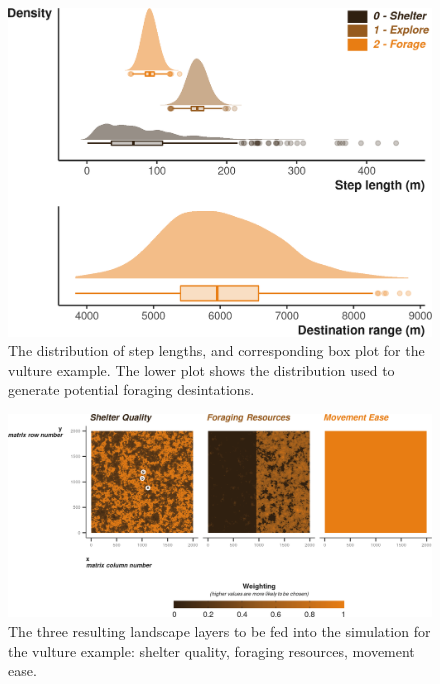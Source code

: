 \documentclass[10pt,a4paper]{article}
\begin{document}
\begin{figure}

{\centering \includegraphics{Agent-based_model_walkthrough_files/figure-latex/VULTUREsettingMoveDesPlot-1} 

}

\caption{The distribution of step lengths, and corresponding box plot for the vulture example. The lower plot shows the distribution used to generate potential foraging desintations.}\label{fig:VULTUREsettingMoveDesPlot}
\end{figure}

\begin{figure}

{\centering \includegraphics{Agent-based_model_walkthrough_files/figure-latex/VULTURElayersFigure-1} 

}

\caption{The three resulting landscape layers to be fed into the simulation for the vulture example: shelter quality, foraging resources, movement ease.}\label{fig:VULTURElayersFigure}
\end{figure}
\end{document}
